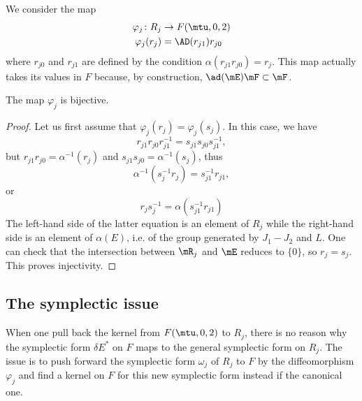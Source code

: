 We consider the map
\begin{equation}
\begin{aligned}
 \varphi_j\colon R_j&\to F(\mtu,0,2) \\ 
\varphi_j(r_{j})&= \AD(r_{j1})r_{j0} 
\end{aligned}
\end{equation}
where $r_{j0}$ and $r_{j1}$ are defined by the condition $\alpha(r_{j1}r_{j0})=r_{j}$. This map actually takes its values in $F$ because, by construction, $\ad(\mE)\mF\subset\mF$.

\begin{theorem}
The map $\varphi_j$ is bijective.
\end{theorem}

\begin{proof}
Let us first assume that $\varphi_j(r_{j})=\varphi_j(s_{j})$. In this case, we have
\[ 
  r_{j1}r_{j0}r_{j1}^{-1}=s_{j1}s_{j0}s_{j1}^{-1}, 
\]
but $r_{j1}r_{j0}=\alpha^{-1}(r_{j})$ and $s_{j1}s_{j0}=\alpha^{-1}(s_{j})$, thus
\[ 
  \alpha^{-1}(s_{j}^{-1}r_{j})=s_{j1}^{-1}r_{j1},
\]
or
\[ 
  r_{j}s_{j}^{-1}=\alpha(s_{j1}^{-1}r_{j1})
\]
The left-hand side of the latter equation is an element of $R_{j}$ while the right-hand side is an element of $\alpha(E)$, i.e. of the group generated by $J_{1}-J_{2}$ and $L$. One can check that the intersection between $\mR_{j}$ and $\mE$ reduces to $\{ 0 \}$, so $r_{j}=s_{j}$. This proves injectivity.
\end{proof}

\subsection{The symplectic issue}

When one pull back the kernel from $F(\mtu,0,2)$ to $R_{j}$, there is no reason why the symplectic form $\delta E^*$ on $F$ maps to the general symplectic form on $R_j$. The issue is to push forward the symplectic form $\omega_{j}$ of $R_j$ to $F$ by the diffeomorphism $\varphi_j$ and find a kernel on $F$ for this new symplectic form instead if the canonical one. 

